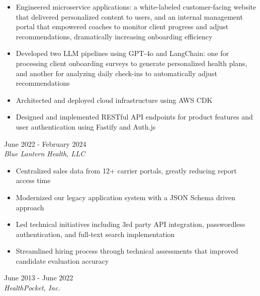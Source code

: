 \documentclass{resume}
\begin{document}
\begin{spacing}{1.2}
\begin{paracol}{2}
		\nointerlineskip
		\begin{itemize}
			\item Engineered microservice applications: a white-labeled customer-facing website that delivered personalized content to users, and an internal management portal that empowered coaches to monitor client progress and adjust recommendations, dramatically increasing onboarding efficiency
			\item Developed two LLM pipelines using GPT-4o and LangChain: one for processing client onboarding surveys to generate personalized health plans, and another for analyzing daily check-ins to automatically adjust recommendations
			\item Architected and deployed cloud infrastructure using AWS CDK
			\item Designed and implemented RESTful API endpoints for product features and user authentication using Fastify and Auth.js
		\end{itemize}

		\medskip

		{\large{}}
		\hfill{\color{subcontent} June 2022 - February 2024}\\
		\textit{Blue Lantern Health, LLC}
		
		\nointerlineskip
		\begin{itemize}
			\item Centralized sales data from 12+ carrier portals, greatly reducing report access time
			\item Modernized our legacy application system with a JSON Schema driven approach
			\item Led technical initiatives including 3rd party API integration, passwordless authentication, and full-text search implementation
			\item Streamlined hiring process through technical assessments that improved candidate evaluation accuracy
		\end{itemize}

		\medskip

		{\large{}}
		\hfill{\color{subcontent} June 2013 - June 2022}\\
		\textit{HealthPocket, Inc.}


\end{paracol}
\end{spacing}
\end{document}
